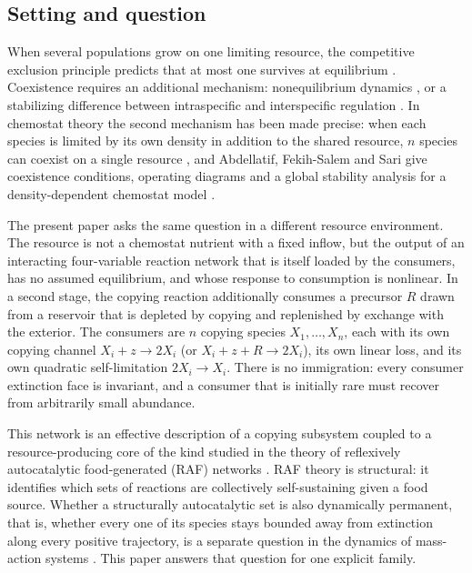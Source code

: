 \documentclass[11pt,a4paper]{article}
\theoremstyle{plain}
\theoremstyle{definition}
\theoremstyle{remark}
\begin{document}
\subsection{Setting and question}
When several populations grow on one limiting resource, the competitive exclusion principle predicts that at most one survives at equilibrium \cite{Hardin1960,HsuHubbellWaltman1977,SmithWaltman1995}. Coexistence requires an additional mechanism: nonequilibrium dynamics \cite{ArmstrongMcGehee1980}, or a stabilizing difference between intraspecific and interspecific regulation \cite{Chesson2000}. In chemostat theory the second mechanism has been made precise: when each species is limited by its own density in addition to the shared resource, $n$ species can coexist on a single resource \cite{LobryMazencRapaport2005,LobryHarmand2006}, and Abdellatif, Fekih-Salem and Sari give coexistence conditions, operating diagrams and a global stability analysis for a density-dependent chemostat model \cite{AbdellatifFekihSalemSari2016}.

The present paper asks the same question in a different resource environment. The resource is not a chemostat nutrient with a fixed inflow, but the output of an interacting four-variable reaction network that is itself loaded by the consumers, has no assumed equilibrium, and whose response to consumption is nonlinear. In a second stage, the copying reaction additionally consumes a precursor $R$ drawn from a reservoir that is depleted by copying and replenished by exchange with the exterior. The consumers are $n$ copying species $X_1,\dots,X_n$, each with its own copying channel $X_i+z\to2X_i$ (or $X_i+z+R\to2X_i$), its own linear loss, and its own quadratic self-limitation $2X_i\to X_i$. There is no immigration: every consumer extinction face is invariant, and a consumer that is initially rare must recover from arbitrarily small abundance.

This network is an effective description of a copying subsystem coupled to a resource-producing core of the kind studied in the theory of reflexively autocatalytic food-generated (RAF) networks \cite{Kauffman1986,HordijkSteel2004,HordijkSteel2018,SteelHordijkXavier2019}. RAF theory is structural: it identifies which sets of reactions are collectively self-sustaining given a food source. Whether a structurally autocatalytic set is also dynamically permanent, that is, whether every one of its species stays bounded away from extinction along every positive trajectory, is a separate question in the dynamics of mass-action systems \cite{AngeliDeLeenheerSontag2007,CraciunNazarovPantea2013,Feinberg2019}. This paper answers that question for one explicit family.
\end{document}
